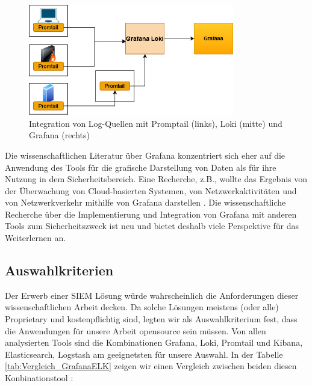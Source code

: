
\begin{figure}[H]
   \centering
   \includegraphics[width=0.8\textwidth]{assets/Promtail.png}
   \caption[Integration von Log-Quellen mit Promptail, Loki und Grafana]
   {Integration von Log-Quellen mit Promptail (links), Loki (mitte) und Grafana (rechts)}
   \label{fig:Integration_Loki_Promtail_Grafana}
   \centering
\end{figure}

Die wissenschaftlichen Literatur über Grafana konzentriert sich eher auf die Anwendung des Tools für die grafische Darstellung von Daten als für ihre Nutzung in dem Sicherheitsbereich. Eine Recherche, z.B., wollte das Ergebnis von der Überwachung von Cloud-basierten Systemen, von Netzwerkaktivitäten und von Netzwerkverkehr mithilfe von Grafana darstellen \citep{Manases_grafananetwork}.
Die wissenschaftliche Recherche über die Implementierung und Integration von Grafana mit anderen Tools zum Sicherheitszweck ist neu und bietet deshalb viele  Perspektive für das Weiterlernen an.

\subsection{Auswahlkriterien}
Der Erwerb einer \gls{SIEM} Lösung würde wahrscheinlich die Anforderungen dieser wissenschaftlichen Arbeit decken. Da solche Lösungen meistens (oder alle) \gls{Proprietary} und kostenpflichtig sind, legten wir als Auswahlkriterium fest, dass die Anwendungen für unsere Arbeit \gls{opensource} sein müssen. Von allen analysierten Tools sind die Kombinationen Grafana, Loki, Promtail und Kibana, Elasticsearch, Logstash  am geeignetsten für unsere Auswahl. In der Tabelle \ref{tab:Vergleich_GrafanaELK} zeigen wir einen Vergleich zwischen beiden diesen Konbinationstool \citep{Anand_LokixELK}:

